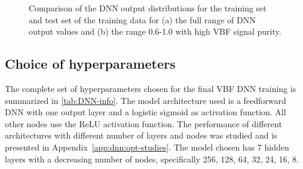 \begin{figure}[t]
    \caption[Comparison of the DNN output distributions for the training set and test set of the training data.]{Comparison of the DNN output distributions for the training set and test set of the training data for (a) the full range of DNN output values and (b) the range 0.6-1.0 with high VBF signal purity.}
    \label{fig:dnn-train-vs-test}
\end{figure}

\subsection{Choice of hyperparameters}
\label{subsec:hyper-parameters}
The complete set of hyperparameters chosen for the final VBF DNN training is summarized in \cref{tab:DNN-info}. 
The model architecture used is a feedforward DNN with one output layer and a logistic sigmoid as activation function. All other nodes use the ReLU activation function.
The performance of different architectures with different number of layers and nodes was studied and is presented in Appendix~\ref{app:dnn:opt-studies}.
The model chosen has 7 hidden layers with a decreasing number of nodes, specifically {256, 128, 64, 32, 24, 16, 8}.

